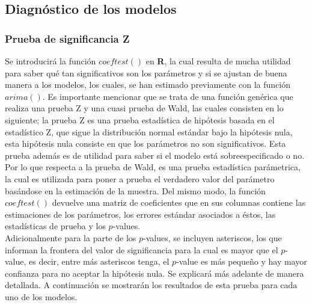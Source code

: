 \documentclass{article}
\theoremstyle{remark}
\begin{document}
\begin{comment}
Call:
arima(x = ts, order = c(1, 1, 2), fixed = c(NA, 0, NA))

Coefficients:
          ar1  ma1      ma2
      -0.9376    0  -0.8073
s.e.   0.0905    0   0.1672

sigma^2 estimated as 0.03603:  log likelihood = 10.53,  aic = -15.07
> coeftest(ARIMA_1_1_2)

z test of coefficients:

     Estimate Std. Error  z value  Pr(>|z|)    
ar1 -0.937623   0.090537 -10.3562 < 2.2e-16 ***
ma2 -0.807331   0.167172  -4.8293  1.37e-06 ***
---
Signif. codes:  0 ‘***’ 0.001 ‘**’ 0.01 ‘*’ 0.05 ‘.’ 0.1 ‘ ’ 1
\end{verbatim}
\end{comment}

\subsection{Diagnóstico de los modelos}

\subsubsection{Prueba de significancia Z}

Se introducirá la función $coeftest()$ en \textbf{R}, la cual resulta de mucha utilidad para saber qué tan significativos son los parámetros  y si se ajustan de buena manera a los modelos, los cuales, se han estimado previamente con la función $arima()$. Es importante mencionar que se trata de una función genérica que realiza una prueba Z y una cuasi prueba de Wald, las cuales consisten en lo siguiente; la prueba Z es una prueba estadística de hipótesis basada en el estadístico Z, que sigue la distribución normal estándar bajo la hipótesis nula, esta hipótesis nula consiste en que los parámetros no son significativos. Esta prueba además es de utilidad para saber si el modelo está sobreespecificado o no.\\

Por lo que respecta a la prueba de Wald, es una prueba estadística parámetrica, la cual es utilizada para poner a prueba el verdadero valor del parámetro basándose en la estimación de la muestra. Del mismo modo, la función $coeftest()$ devuelve una matriz de coeficientes que en sus columnas contiene las estimaciones de los parámetros, los errores estándar asociados a éstos, las estadísticas de prueba y los \(p\)-values. \\

Adicionalmente para la parte de los \(p\)-values, se incluyen asteriscos, los que informan la frontera del valor de significancia para la cual es mayor que el \(p\)-value, es decir, entre más asteriscos tenga, el \(p\)-value es más pequeño y hay mayor confianza para no aceptar la hipótesis nula. Se explicará más adelante de manera detallada. A continuación se mostrarán los resultados de esta prueba para cada uno de los modelos.\\
\end{document}
